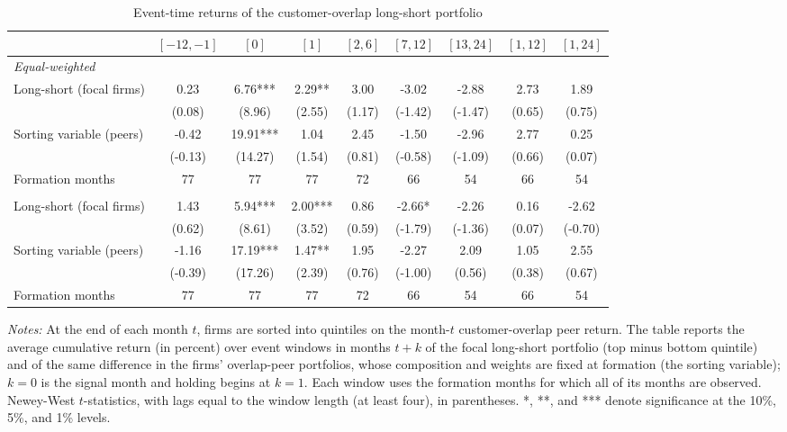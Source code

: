 \begin{table}[!htbp]\centering
\caption{Event-time returns of the customer-overlap long-short portfolio}\label{tab:eventtime}
\footnotesize
\begin{tabular*}{\linewidth}{@{\extracolsep{\fill}}lcccccccc}
\toprule
 & $[-12,-1]$ & $[0]$ & $[1]$ & $[2,6]$ & $[7,12]$ & $[13,24]$ & $[1,12]$ & $[1,24]$ \\
\midrule
\multicolumn{9}{l}{\emph{Equal-weighted}} \\
\quad Long-short (focal firms) & 0.23 & 6.76*** & 2.29** & 3.00 & -3.02 & -2.88 & 2.73 & 1.89 \\
 & (0.08) & (8.96) & (2.55) & (1.17) & (-1.42) & (-1.47) & (0.65) & (0.75) \\
\quad Sorting variable (peers) & -0.42 & 19.91*** & 1.04 & 2.45 & -1.50 & -2.96 & 2.77 & 0.25 \\
 & (-0.13) & (14.27) & (1.54) & (0.81) & (-0.58) & (-1.09) & (0.66) & (0.07) \\
\quad Formation months & 77 & 77 & 77 & 72 & 66 & 54 & 66 & 54 \\
\addlinespace
\multicolumn{9}{l}{\emph{Value-weighted}} \\
\quad Long-short (focal firms) & 1.43 & 5.94*** & 2.00*** & 0.86 & -2.66* & -2.26 & 0.16 & -2.62 \\
 & (0.62) & (8.61) & (3.52) & (0.59) & (-1.79) & (-1.36) & (0.07) & (-0.70) \\
\quad Sorting variable (peers) & -1.16 & 17.19*** & 1.47** & 1.95 & -2.27 & 2.09 & 1.05 & 2.55 \\
 & (-0.39) & (17.26) & (2.39) & (0.76) & (-1.00) & (0.56) & (0.38) & (0.67) \\
\quad Formation months & 77 & 77 & 77 & 72 & 66 & 54 & 66 & 54 \\
\bottomrule
\end{tabular*}
\par\vspace{4pt}\begin{minipage}{\linewidth}\scriptsize \emph{Notes:} At the end of each month $t$, firms are sorted into quintiles on the month-$t$ customer-overlap peer return. The table reports the average cumulative return (in percent) over event windows in months $t+k$ of the focal long-short portfolio (top minus bottom quintile) and of the same difference in the firms' overlap-peer portfolios, whose composition and weights are fixed at formation (the sorting variable); $k=0$ is the signal month and holding begins at $k=1$. Each window uses the formation months for which all of its months are observed. Newey-West $t$-statistics, with lags equal to the window length (at least four), in parentheses. *, **, and *** denote significance at the 10\%, 5\%, and 1\% levels.\end{minipage}
\end{table}